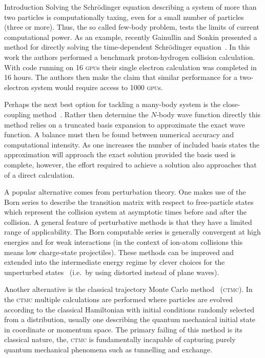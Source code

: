 \documentclass[letterpaper, 11 pt]{report}
\begin{document}
\begin{chapter}{Introduction \label{chap:intro}}
   Solving the Schr\"{o}dinger equation describing a system of more than two particles is
   computationally taxing, even for a small number of particles (three or more). Thus, the so called
   few-body problem, tests the limits of current computational power. As an example, recently Gainullin
   and Sonkin presented a method for directly solving the time-dependent Schr\"{o}dinger
   equation~\cite{gpuCalc}. In this work the authors performed a benchmark proton-hydrogen collision
   calculation. With code running on 16 \textsc{gpu}s their single electron calculation was completed in
   16 hours. The authors then make the claim that similar performance for a two-electron system would
   require access to 1000 \textsc{gpu}s.

   Perhaps the next best option for tackling a many-body system is the close-coupling
   method~\cite{ccRev}. Rather then determine the $N$-body wave function directly this method relies on
   a truncated basis expansion to approximate the exact wave function. A balance must then be found
   between numerical accuracy and computational intensity. As one increases the number of included basis
   states the approximation will approach the exact solution provided the basis used is complete,
   however, the effort required to achieve a solution also approaches that of a direct calculation.

   A popular alternative comes from perturbation theory. One makes use of the Born series to describe
   the transition matrix with respect to free-particle states which represent the collision system at
   asymptotic times before and after the collision. A general feature of perturbative methods is that
   they have a limited range of applicability. The Born computable series is generally convergent at
   high energies and for weak interactions (in the context of ion-atom collisions this means low
   charge-state projectiles). These methods can be improved and extended into the intermediate energy
   regime by clever choices for the unperturbed states~\cite{perRev1, perRev2} (i.e.\ by using distorted
   instead of plane waves).

   Another alternative is the classical trajectory Monte Carlo method~\cite{ctmcRev} (\textsc{ctmc}). In
   the \textsc{ctmc} multiple calculations are performed where particles are evolved according to the
   classical Hamiltonian with initial conditions randomly selected from a distribution, usually one
   describing the quantum mechanical initial state in coordinate or momentum space. The primary failing
   of this method is its classical nature, the, \textsc{ctmc} is fundamentally incapable of capturing
   purely quantum mechanical phenomena such as tunnelling and exchange.


\end{chapter}
\end{document}
